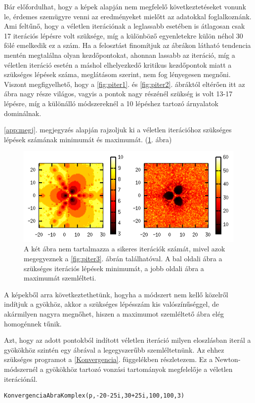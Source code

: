 \documentclass[a4paper,12pt]{report}
\begin{document}
				Bár előfordulhat, hogy a képek alapján nem megfelelő következtetéseket vonunk le, érdemes szemügyre venni az eredményeket mielőtt az adatokkal foglalkoznánk. Ami feltűnő, hogy a véletlen iterációnak a leglassabb esetében is átlagosan csak 17 iterációs lépésre volt szüksége, míg a különböző egyenletekre külön néhol 30 fölé emelkedik ez a szám. Ha a felosztást finomítjuk az ábrákon látható tendencia mentén megtalálna olyan kezdőpontokat, ahonnan lassabb az iteráció, míg a véletlen iteráció esetén a máshol elhelyezkedő kritikus kezdőpontok miatt a szükséges lépések száma, meglátásom szerint, nem fog lényegesen megnőni. Viszont megfigyelhető, hogy a \ref{fig:piter1}. és \ref{fig:piter2}. ábráktól eltérően itt az ábra nagy része világos, vagyis a pontok nagy részénél szükség is volt 13-17 lépésre, míg a különálló módszereknél a 10 lépéshez tartozó árnyalatok dominálnak.

				\ref{app:megj}. megjegyzés alapján rajzoljuk ki a véletlen iterációhoz szükséges lépések számának minimumát és maximumát. (\ref{img:megj}. ábra)

				\begin{figure}[hp]
					\centering
					\includegraphics[scale=0.7]{kepek/p-iter3_2.png}
					\caption{A két ábra nem tartalmazza a sikeres iterációk számát, mivel azok megegyeznek a \ref{fig:piter3}. ábrán találhatóval. A bal oldali ábra a szükséges iterációs lépések minimumát, a jobb oldali ábra a maximumát szemlélteti.} \label{img:megj}
				\end{figure}

				A képekből arra következtethetünk, hogyha a módszert nem kellő közelről indítjuk a gyökhöz, akkor a szükséges lépésszám kis valószínűséggel, de akármilyen nagyra megnőhet, hiszen a maximumot szemléltető ábra elég homogénnek tűnik.

				Azt, hogy az adott pontokból indított véletlen iteráció milyen eloszlásban iterál a gyökökhöz szintén egy ábrával a legegyszerűbb szemléltetnünk. Az ehhez szükséges programot a \ref{Konvergencia}. függelékben részletezem. Ez a Newton-módszernél a gyökökhöz tartozó vonzási tartományok megfelelője a véletlen iterációnál.
                \begin{singlespace}
				\begin{lstlisting}[caption=Bemenet,label=lst:konvabra]
KonvergenciaAbraKomplex(p,-20-25i,30+25i,100,100,3)
				\end{lstlisting}
				\end{singlespace}
\end{document}
